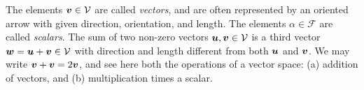 %
%
%

The elements ${\mbox{\boldmath $v$}}\in \mathcal{V}$ are called \emph{vectors}, and are often represented by an oriented arrow with given direction, orientation, and length. The elements $\alpha\in\mathcal{F}$ are called \emph{scalars}. The sum of two non-zero vectors ${\mbox{\boldmath $u$}},{\mbox{\boldmath $v$}}\in\mathcal{V}$ is a third vector ${\mbox{\boldmath $w$}} = {\mbox{\boldmath $u$}}+{\mbox{\boldmath $v$}}\in\mathcal{V}$ with direction and length different from both ${\mbox{\boldmath $u$}}$ and ${\mbox{\boldmath $v$}}$.  We may write ${\mbox{\boldmath $v$}}+{\mbox{\boldmath $v$}} = 2{\mbox{\boldmath $v$}}$, and see here both the operations of a vector space: (a) addition of vectors, and (b) multiplication times a scalar. 

